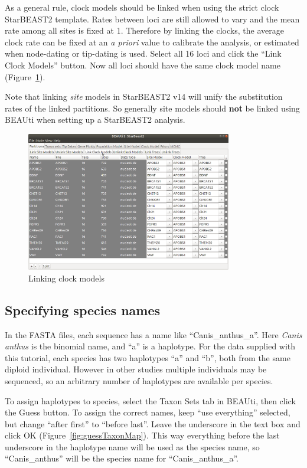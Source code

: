\documentclass[12pt]{article}
\begin{document}
As a general rule, clock models should be linked when using the strict clock StarBEAST2 template. Rates between
loci are still allowed to vary and the mean rate among all sites is fixed at 1. Therefore
by linking the clocks, the average clock rate can be fixed at an \textit{a priori} value
to calibrate the analysis, or estimated when node-dating or tip-dating is used.
Select all 16 loci and click the ``Link Clock Models'' button. Now all loci
should have the same clock model name (Figure~\ref{fig:linkModels}).

Note that linking \textit{site} models in StarBEAST2 v14 will unify the substitution rates of
the linked partitions. So generally site models should \textbf{not} be linked using BEAUti
when setting up a StarBEAST2 analysis.

\begin{figure}[htb!]
\centering
\includegraphics[width=0.8\textwidth]{figures/linkModels.png}
\caption
{Linking clock models}
\label{fig:linkModels}
\end{figure}

\clearpage

\subsection{Specifying species names}
\label{subsec:speciesNames}

In the FASTA files, each sequence has a name like ``Canis\_anthus\_a''.
Here \textit{Canis anthus} is the binomial name, and ``a'' is a haplotype.
For the data supplied with this tutorial, each species has two haplotypes ``a'' and ``b'', both from
the same diploid individual. However in other studies multiple individuals may
be sequenced, so an arbitrary number of haplotypes are available per species.

To assign haplotypes to species, select the Taxon Sets tab in BEAUti, then
click the Guess button. To assign the correct names, keep ``use everything''
selected, but change ``after first'' to ``before last''. Leave the underscore
in the text box and click OK (Figure~\ref{fig:guessTaxonMap}). This way everything before
the last underscore in the haplotype name will be used as the species name,
so ``Canis\_anthus'' will be the species name for ``Canis\_anthus\_a''.
\end{document}
